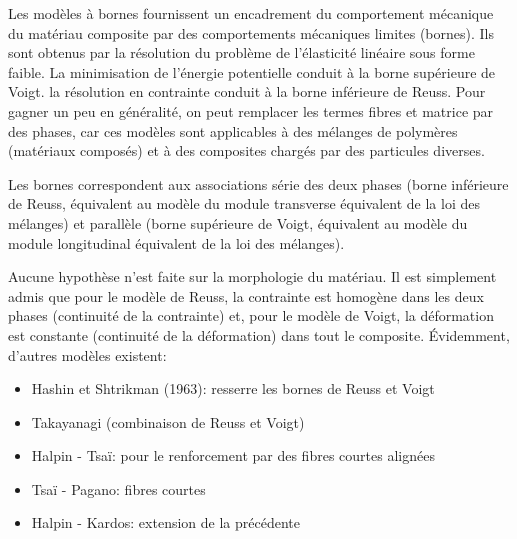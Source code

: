 \medskipvm
Les modèles à bornes fournissent un encadrement du comportement mécanique du matériau composite
par des comportements mécaniques limites (bornes).
Ils sont obtenus par la résolution du problème de l'élasticité linéaire sous forme faible.
La minimisation de l'énergie potentielle conduit à la borne supérieure de Voigt.
la résolution en contrainte conduit à la borne inférieure de Reuss.
\medskipvm
Pour gagner un peu en généralité, on peut remplacer les termes fibres et matrice par des phases,
car ces modèles sont applicables à des mélanges de polymères (matériaux composés)
et à des composites chargés par des particules diverses.

Les bornes correspondent aux associations série des deux phases (borne inférieure de Reuss,
équivalent au modèle du module transverse équivalent de la loi des mélanges) et parallèle
(borne supérieure de Voigt, équivalent au modèle du module longitudinal équivalent de la loi des mélanges).

Aucune hypothèse n'est faite sur la morphologie du matériau.
Il est simplement admis que pour le modèle de Reuss, la contrainte est homogène dans les deux
phases (continuité de la contrainte) et, pour le modèle de Voigt,
la déformation est constante (continuité de la déformation) dans tout le composite.
\medskipvm
Évidemment, d'autres modèles existent:
\begin{itemize}
	\item Hashin et Shtrikman (1963): resserre les bornes de Reuss et Voigt
	\item Takayanagi (combinaison de Reuss et Voigt)
	\item Halpin - Tsaï: pour le renforcement par des fibres courtes alignées
	\item Tsaï - Pagano: fibres courtes
	\item Halpin - Kardos: extension de la précédente
\end{itemize}

\medskip
